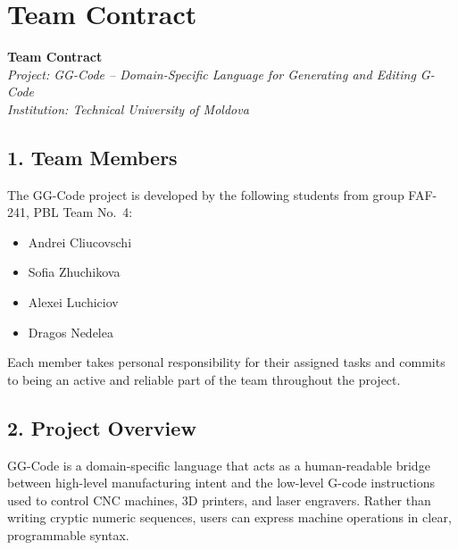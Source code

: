 \chapter{Team Contract}

\begin{center}
    {\Large\textbf{Team Contract}}\\[0.4em]
    \textit{Project: GG-Code -- Domain-Specific Language for Generating and Editing G-Code}\\[0.2em]
    \textit{Institution: Technical University of Moldova}
\end{center}

\vspace{1em}

\section*{1. Team Members}

The GG-Code project is developed by the following students from group FAF-241, PBL Team No.~4:

\begin{itemize}[leftmargin=2em, label={--}]
    \item Andrei Cliucovschi
    \item Sofia Zhuchikova
    \item Alexei Luchiciov
    \item Dragos Nedelea
\end{itemize}

Each member takes personal responsibility for their assigned tasks and commits to being an active
and reliable part of the team throughout the project.

\section*{2. Project Overview}

GG-Code is a domain-specific language that acts as a human-readable bridge between high-level
manufacturing intent and the low-level G-code instructions used to control CNC machines, 3D
printers, and laser engravers. Rather than writing cryptic numeric sequences, users can express
machine operations in clear, programmable syntax.

